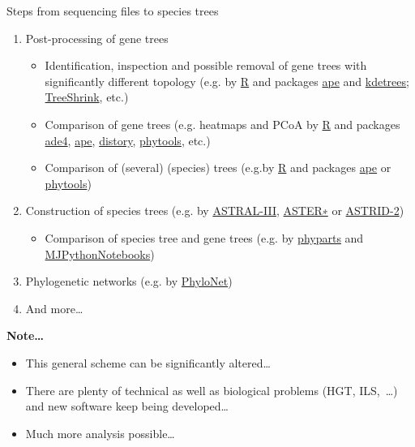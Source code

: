 \documentclass[compress,  xelatex, 11pt, xcolor=x11names, aspectratio=169,
	hyperref={
		bookmarks=true,
		unicode=true,
		colorlinks=true,
		pdftitle={HybSeq course},
		plainpages=false,
		pdfauthor={Vojtech Zeisek},
		pdfsubject={Practical processing of HybSeq target enrichment sequencing data on computing grids like MetaCentrum},
		pdfcreator={XeLaTeX},
		pdfkeywords={BASH, command line, GNU, HybSeq, Linux, MetaCentrum, sequencing shell, target enrichment},
		linkcolor=Turquoise4, %
		anchorcolor=DodgerBlue4, %
		citecolor=DodgerBlue4, %
		filecolor=DodgerBlue4, %
		menucolor=Tan4, %
		urlcolor=DarkOliveGreen4 %
		},
	url={hyphens, lowtilde} %
	]{beamer}
\begin{document}
\begin{frame}[allowframebreaks]{Steps from sequencing files to species trees}
\begin{enumerate}
		\item Post-processing of gene trees
		\begin{itemize}
			\item Identification, inspection and possible removal of gene trees with significantly different topology (e.g. by \href{https://www.r-project.org/}{R} and packages \href{https://cran.r-project.org/package=ape}{ape} and \href{https://github.com/V-Z/kdetrees}{kdetrees}; \href{https://github.com/uym2/TreeShrink}{TreeShrink}, etc.)
			\item Comparison of gene trees (e.g. heatmaps and PCoA by \href{https://www.r-project.org/}{R} and packages \href{https://cran.r-project.org/package=ade4}{ade4}, \href{https://cran.r-project.org/package=ape}{ape}, \href{https://cran.r-project.org/package=distory}{distory}, \href{https://cran.r-project.org/package=phytools}{phytools}, etc.)
			\item Comparison of (several) (species) trees (e.g.by \href{https://www.r-project.org/}{R} and packages \href{https://cran.r-project.org/package=ape}{ape} or \href{https://cran.r-project.org/package=phytools}{phytools})
		\end{itemize}
		\item Construction of species trees (e.g. by \href{https://github.com/smirarab/ASTRAL}{ASTRAL-III}, \href{https://github.com/chaoszhang/ASTER}{ASTER∗} or \href{https://github.com/pranjalv123/ASTRID}{ASTRID-2})
		\begin{itemize}
			\item Comparison of species tree and gene trees (e.g. by \href{https://bitbucket.org/blackrim/phyparts}{phyparts} and \href{https://github.com/mossmatters/MJPythonNotebooks}{MJPythonNotebooks})
		\end{itemize}
		\item Phylogenetic networks (e.g. by \href{https://phylogenomics.rice.edu/html/phylonet.html}{PhyloNet})
		\item And more\ldots
	\end{enumerate}
	\vfill
	\begin{block}{\textbf{Note\ldots}}
		\begin{itemize}
			\item This general scheme can be significantly altered\ldots
			\item There are plenty of technical as well as biological problems (HGT, ILS,~\ldots) and new software keep being developed\ldots
			\item Much more analysis possible\ldots
		\end{itemize}
	\end{block}
	\vfill
\end{frame}
\end{document}
